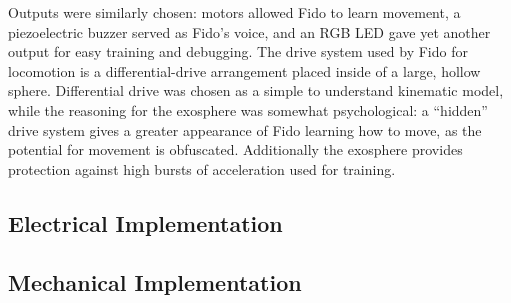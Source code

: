 Outputs were similarly chosen: motors allowed Fido to learn movement, a piezoelectric buzzer served as Fido's voice, and an RGB LED gave yet another output for easy training and debugging.  The drive system used by Fido for locomotion is a differential-drive arrangement placed inside of a large, hollow sphere.  Differential drive was chosen as a simple to understand kinematic model, while the reasoning for the exosphere was somewhat psychological: a ``hidden'' drive system gives a greater appearance of Fido learning how to move, as the potential for movement is obfuscated.  Additionally the exosphere provides protection against high bursts of acceleration used for training.




\subsection{Electrical Implementation}

\subsection{Mechanical Implementation}